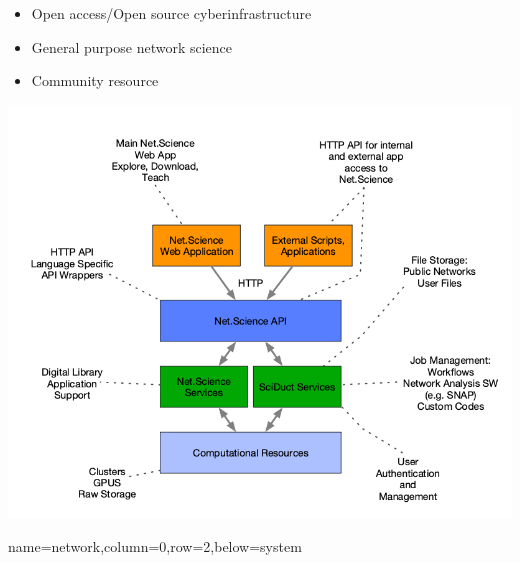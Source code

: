 \documentclass[landscape,paperwidth=70in,paperheight=46in,fontscale=0.225]{baposter} %
\begin{document}
\begin{poster}
{\begin{minipage}{.5\textwidth}
\begin{itemize}[leftmargin=*,noitemsep,topsep=0pt]
\item Open access/Open source cyberinfrastructure
\item General purpose network science
\item Community resource
\end{itemize}
\end{minipage}
\hfill
\begin{minipage}{.5\textwidth}
\begin{center}
\includegraphics[scale=0.2]{figures/sys_descr.png}
\end{center}
\end{minipage}
}

          {name=network,column=0,row=2,below=system}{         

}
\end{poster}
\end{document}
